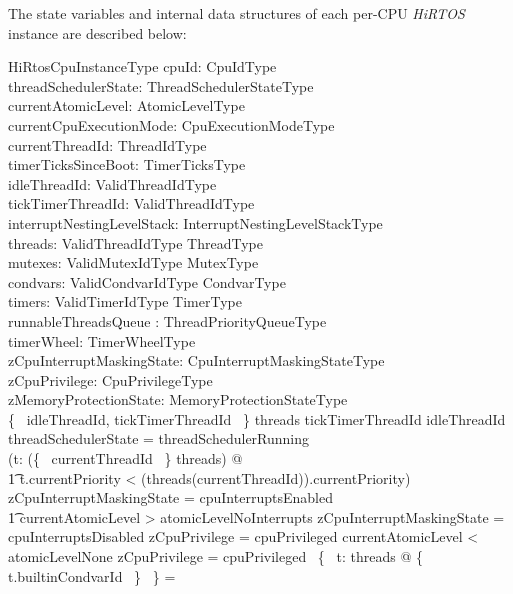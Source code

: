 \documentclass[11pt,letterpaper,twoside,openany]{book}
\begin{document}
The state variables and internal data structures of each per-CPU \emph{HiRTOS} instance
are described below:

\begin{schema}{HiRtosCpuInstanceType}
    cpuId: CpuIdType \\
    threadSchedulerState: ThreadSchedulerStateType \\
    currentAtomicLevel: AtomicLevelType \\
    currentCpuExecutionMode: CpuExecutionModeType \\
    currentThreadId: ThreadIdType \\
    timerTicksSinceBoot: TimerTicksType \\
    idleThreadId: ValidThreadIdType \\
    tickTimerThreadId: ValidThreadIdType \\
    interruptNestingLevelStack: InterruptNestingLevelStackType \\
    threads: ValidThreadIdType \finj ThreadType \\
    mutexes: ValidMutexIdType \finj MutexType \\
    condvars: ValidCondvarIdType \finj CondvarType \\
    timers: ValidTimerIdType \finj TimerType \\
    runnableThreadsQueue : ThreadPriorityQueueType \\
    timerWheel: TimerWheelType \\
    zCpuInterruptMaskingState: CpuInterruptMaskingStateType \\
    zCpuPrivilege: CpuPrivilegeType \\
    zMemoryProtectionState: MemoryProtectionStateType \\
\where
    \{~ idleThreadId, tickTimerThreadId ~\} \subseteq \dom threads
\also
    tickTimerThreadId \neq idleThreadId
\also
    threadSchedulerState = threadSchedulerRunning \implies \\
    (\forall t: \ran (\{~ currentThreadId ~\} \ndres threads) @ \\
\t1    t.currentPriority < (threads(currentThreadId)).currentPriority)
\also
    zCpuInterruptMaskingState = cpuInterruptsEnabled \iff \\
\t1 currentAtomicLevel > atomicLevelNoInterrupts
\also
    zCpuInterruptMaskingState = cpuInterruptsDisabled \implies zCpuPrivilege = cpuPrivileged
\also
    currentAtomicLevel < atomicLevelNone \implies zCpuPrivilege = cpuPrivileged
\also
    \bigcap~\{~ t: \ran threads @ \{~ t.builtinCondvarId ~\} ~\} = \emptyset

\end{schema}
\end{document}
